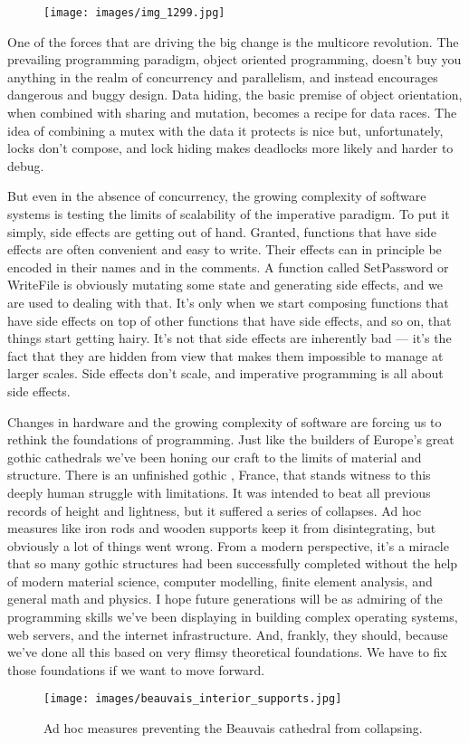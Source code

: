 \begin{figure}[H]
  \centering
  \texttt{[image: images/img\_1299.jpg]}
\end{figure}

\noindent
One of the forces that are driving the big change is the multicore
revolution. The prevailing programming paradigm, object oriented
programming, doesn't buy you anything in the realm of concurrency and
parallelism, and instead encourages dangerous and buggy design. Data
hiding, the basic premise of object orientation, when combined with
sharing and mutation, becomes a recipe for data races. The idea of
combining a mutex with the data it protects is nice but, unfortunately,
locks don't compose, and lock hiding makes deadlocks more likely and
harder to debug.

But even in the absence of concurrency, the growing complexity of
software systems is testing the limits of scalability of the imperative
paradigm. To put it simply, side effects are getting out of hand.
Granted, functions that have side effects are often convenient and easy
to write. Their effects can in principle be encoded in their names and
in the comments. A function called SetPassword or WriteFile is obviously
mutating some state and generating side effects, and we are used to
dealing with that. It's only when we start composing functions that have
side effects on top of other functions that have side effects, and so
on, that things start getting hairy. It's not that side effects are
inherently bad --- it's the fact that they are hidden from view that
makes them impossible to manage at larger scales. Side effects don't
scale, and imperative programming is all about side effects.

Changes in hardware and the growing complexity of software are forcing
us to rethink the foundations of programming. Just like the builders of
Europe's great gothic cathedrals we've been honing our craft to the
limits of material and structure. There is an unfinished gothic
, France, that stands witness to this deeply human struggle
with limitations. It was intended to beat all previous records of height
and lightness, but it suffered a series of collapses. Ad hoc measures
like iron rods and wooden supports keep it from disintegrating, but
obviously a lot of things went wrong. From a modern perspective, it's a
miracle that so many gothic structures had been successfully completed
without the help of modern material science, computer modelling, finite
element analysis, and general math and physics. I hope future
generations will be as admiring of the programming skills we've been
displaying in building complex operating systems, web servers, and the
internet infrastructure. And, frankly, they should, because we've done
all this based on very flimsy theoretical foundations. We have to fix
those foundations if we want to move forward.

\begin{figure}
  \centering
  \texttt{[image: images/beauvais\_interior\_supports.jpg]}
  \caption{Ad hoc measures preventing the Beauvais cathedral from collapsing.}
\end{figure}
